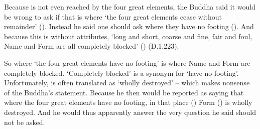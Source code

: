 Because  is not even reached by the four great elements, the Buddha said it would be wrong to ask if that is where `the four great elements cease without remainder' (). Instead he said one should ask where they have no footing (). And because this  is without attributes, `long and short, coarse and fine, fair and foul, Name and Form are all completely blocked' () (D.1.223).

So where `the four great elements have no footing' is where Name and Form are completely blocked. `Completely blocked' is a synonym for `have no footing'. Unfortunately,  is often translated as `wholly destroyed' -- which makes nonsense of the Buddha's statement. Because he then would be reported as saying that where the four great elements have no footing, in that place () Form () is wholly destroyed. And he would thus apparently answer the very question he said should not be asked.
